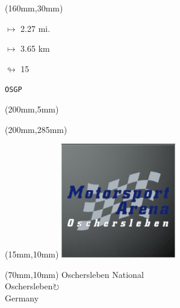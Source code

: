 \begin{textblock*}{40mm}(160mm,30mm)%
\Large
\par$\mapsto$ 2.27 mi.
\par$\mapsto$ 3.65 km
\par$\looparrowright$ 15
\par\hfill\tiny\tt OSGP\\
\end{textblock*}
\begin{textblock*}{20mm}(200mm,5mm)%
\fbox{\thepage}
\label{OSGP}
\end{textblock*}
\begin{textblock*}{20mm}(200mm,285mm)%
\fbox{\thepage}
\end{textblock*}

\null\newpage
\begin{textblock*}{50mm}(15mm,10mm)%
\includegraphics[width=50mm]{LG/2015-05-20_00090.png}
\end{textblock*}
\begin{textblock*}{130mm}(70mm,10mm)%
{\fontsize{20}{20}\selectfont Oschersleben National\\}
{\fontsize{16}{16}\selectfont Oschersleben\hfill \Large$\circlearrowright$\\}
{\fontsize{12}{12}\selectfont Germany\\}
\end{textblock*}
